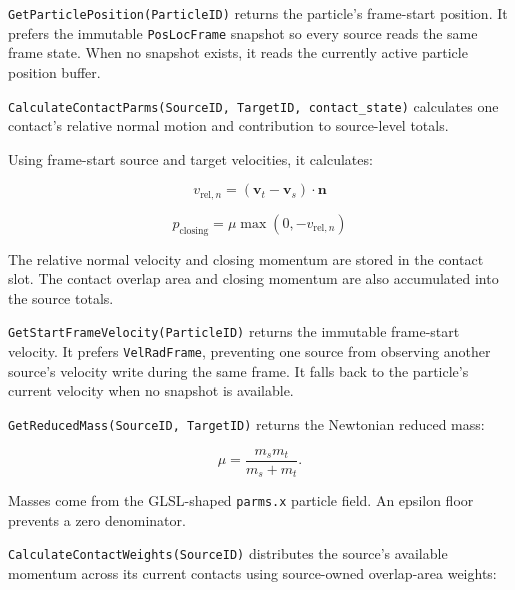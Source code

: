
\texttt{GetParticlePosition(ParticleID)} returns the particle's frame-start
position.  It prefers the immutable \texttt{PosLocFrame} snapshot so every
source reads the same frame state.  When no snapshot exists, it reads the
currently active particle position buffer.


\texttt{CalculateContactParms(SourceID, TargetID, contact\_state)} calculates
one contact's relative normal motion and contribution to source-level totals.

Using frame-start source and target velocities, it calculates:

\begin{equation}
v_{\mathrm{rel},n}
=
(\mathbf{v}_{t}-\mathbf{v}_{s})\cdot\mathbf{n}
\end{equation}

\begin{equation}
p_{\mathrm{closing}}
=
\mu\max(0,-v_{\mathrm{rel},n})
\end{equation}

The relative normal velocity and closing momentum are stored in the contact
slot.  The contact overlap area and closing momentum are also accumulated into
the source totals.


\texttt{GetStartFrameVelocity(ParticleID)} returns the immutable frame-start
velocity.  It prefers \texttt{VelRadFrame}, preventing one source from observing
another source's velocity write during the same frame.  It falls back to the
particle's current velocity when no snapshot is available.


\texttt{GetReducedMass(SourceID, TargetID)} returns the Newtonian reduced mass:

\begin{equation}
\mu = \frac{m_s m_t}{m_s + m_t}.
\end{equation}

Masses come from the GLSL-shaped \texttt{parms.x} particle field.  An epsilon
floor prevents a zero denominator.


\texttt{CalculateContactWeights(SourceID)} distributes the source's available
momentum across its current contacts using source-owned overlap-area weights:

